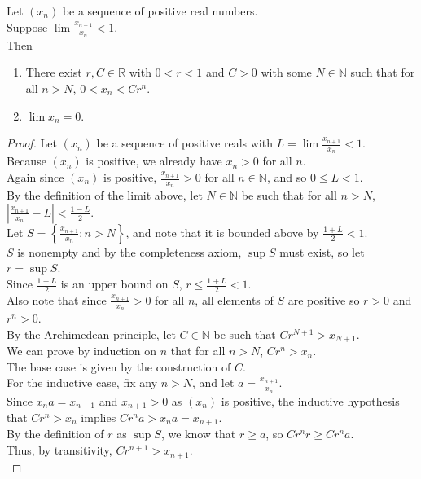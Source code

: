 \documentclass{article}
\newenvironment{theorem}[1]{\renewcommand\theinnercustomthm{#1}\innercustomthm}
  {\endinnercustomthm}
\begin{document}
\begin{theorem}{4}
    Let $(x_n)$ be a sequence of positive real numbers. \\
    Suppose $\lim \frac{x_{n+1}}{x_n} < 1$. \\
    Then 
    \begin{enumerate}
        \item[a.] There exist $r,C \in \mathbb R$ with $0 < r < 1$ and $C > 0$ with some $N \in \mathbb N$ such that for all $n > N$, $0 < x_n < C r^n$.
        \item[b.] $\lim x_n = 0$.
    \end{enumerate}
\end{theorem}
\begin{proof}
    Let $(x_n)$ be a sequence of positive reals with $L=\lim \frac{x_{n+1}}{{x_n}} < 1$. \\
    Because $(x_n)$ is positive, we already have $x_n > 0$ for all $n$. \\
    Again since $(x_n)$ is positive, $\frac{x_{n+1}}{x_n} > 0$ for all $n \in \mathbb N$, and so $0 \le L < 1$. \\
    By the definition of the limit above, let $N \in \mathbb N$ be such that for all $n > N$, $\left| \frac{x_{n+1}}{x_n} - L \right| < \frac{1-L}{2}$. \\
    Let $S = \left\{\frac{x_{n+1}}{x_n} : n > N\right\}$, and note that it is bounded above by $\frac{1+L}{2}<1$. \\
    $S$ is nonempty and by the completeness axiom, $\sup S$ must exist, so let $r = \sup S$. \\
    Since $\frac{1+L}{2}$ is an upper bound on $S$, $r \le \frac{1+L}{2} < 1$.\\ 
    Also note that since $\frac{x_{n+1}}{x_n} > 0$ for all $n$, all elements of $S$ are positive so $r > 0$ and $r^n > 0$. \\
    By the Archimedean principle, let $C \in \mathbb N$ be such that $C r^{N+1} > x_{N+1}$. \\
    We can prove by induction on $n$ that for all $n > N$, $Cr^n > x_n$. \\
    The base case is given by the construction of $C$. \\
    For the inductive case, fix any $n > N$, and let $a = \frac{x_{n+1}}{x_n}$. \\
    Since $x_n a = x_{n+1}$ and $x_{n+1} > 0$ as $(x_n)$ is positive, the inductive hypothesis that $C r^n > x_n$ implies $C r^n a >x_n a = x_{n+1}$. \\
    By the definition of $r$ as $\sup S$, we know that $r \ge a$, so $C r^n r \ge C r^n a$. \\
    Thus, by transitivity, $C r^{n+1} > x_{n+1}$. \\
    

\end{proof}
\end{document}
